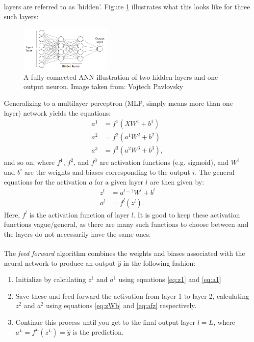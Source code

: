             layers are referred to as 'hidden'. Figure \ref{fig:MLP_full} illustrates what this looks like for three such layers:%
            \begin{figure}[H]
                \centering
                \includegraphics[width=0.4\textwidth]{figures/MLP2.png}
                \caption{A fully connected ANN illustration of two hidden layers and one output neuron. Image taken from: Vojtech Pavlovsky}
                \label{fig:MLP_full}
            \end{figure}
            Generalizing to a multilayer perceptron (MLP, simply means more than one layer) network yields the equations:
            \begin{align}
                a^1 &= f^1\left(X W^1 + b^1\right) \\
                a^2 &= f^2\left(a^1 W^2 + b^2\right) \\
                a^3 &= f^3\left(a^2 W^3 + b^3\right),
            \end{align}
            and so on, where $f^1$, $f^2$, and $f^3$ are activation functions (e.g. sigmoid), and $W^i$ and $b^i$ are the weights and biases corresponding to the output $i$. The general equations for the activation $a$ for a given layer $l$ are then given by:
            \begin{align}\label{eq:zWb}
                z^l &= a^{l-1}W^l + b^l\\\label{eq:afz}
                a^l &= f^l(z^l).
            \end{align}
            Here, $f^l$ is the activation function of layer $l$. It is good to keep these activation functions vague/general, as there are many such functions to choose between and the layers do not necessarily have the same ones.\\\\
            The \textit{feed forward} algorithm combines the weights and biases associated with the neural network to produce an output $\hat{y}$ in the following fashion:
            \begin{enumerate}
                \item Initialize by calculating $z^1$ and $a^1$ using equations \ref{eq:z1} and \ref{eq:a1}
                \item Save these and feed forward the activation from layer 1 to layer 2, calculating $z^2$ and $a^2$ using equations \ref{eq:zWb} and \ref{eq:afz} respectively.
                \item Continue this process until you get to the final output layer $l=L$, where $a^L=f^L(z^L)=\hat{y}$ is the prediction.
            \end{enumerate}
